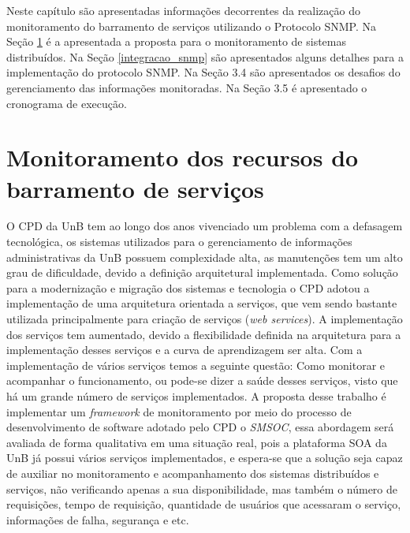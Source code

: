 \label{monitoramento_servicos}

Neste capítulo são apresentadas informações decorrentes da realização do monitoramento do barramento de serviços utilizando o Protocolo \acrshort{SNMP}. Na Seção \ref{recursos_monitoramento} é a apresentada a proposta para o monitoramento de sistemas distribuídos. Na Seção \ref{integracao_snmp} são apresentados alguns detalhes para a implementação do protocolo SNMP. Na Seção 3.4 são apresentados os desafios do gerenciamento das informações monitoradas. Na Seção 3.5 é apresentado o cronograma de execução.

\section{Monitoramento dos recursos do barramento de serviços}%
\label{recursos_monitoramento}

O CPD da \acrlong{UnB} tem ao longo dos anos vivenciado um problema com a defasagem tecnológica, os sistemas utilizados para o gerenciamento de informações administrativas da UnB possuem complexidade alta, as manutenções tem um alto grau de dificuldade, devido a definição arquitetural implementada. Como solução para a modernização e migração dos sistemas e tecnologia o CPD adotou a implementação de uma arquitetura orientada a serviços, que vem sendo bastante utilizada principalmente para criação de serviços (\textit{web services}). A implementação dos serviços tem aumentado, devido a flexibilidade definida na arquitetura para a implementação desses serviços e a curva de aprendizagem ser alta. Com a implementação de vários serviços temos a seguinte questão: Como monitorar e acompanhar o funcionamento, ou pode-se dizer a saúde desses serviços, visto que há um grande número de serviços implementados. A proposta desse trabalho é implementar um \textit{framework} de monitoramento por meio do processo de desenvolvimento de software adotado pelo \acrshort{CPD} o \textit{\acrfull{SMSOC}}\cite{Agilar}, essa abordagem será avaliada de forma qualitativa em uma situação real, pois a plataforma \acrshort{SOA} da \acrshort{UnB} já possui vários serviços implementados, e espera-se que a solução seja capaz de auxiliar no monitoramento e acompanhamento dos sistemas distribuídos e serviços, não verificando apenas a sua disponibilidade, mas também o número de requisições, tempo de requisição, quantidade de usuários que acessaram o serviço, informações de falha, segurança e etc.            

